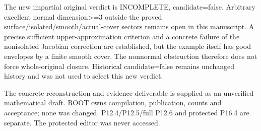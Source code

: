 \documentclass[11pt]{article}
\begin{document}
The new impartial original verdict is INCOMPLETE, candidate=false. Arbitrary excellent normal dimension>=3 outside the proved surface/isolated/smooth/actual-cover sectors remains open in this manuscript. A precise sufficient upper-approximation criterion and a concrete failure of the nonisolated Jacobian correction are established, but the example itself has good envelopes by a finite smooth cover. The nonnormal obstruction therefore does not force whole-original closure. Historical candidate=false remains unchanged history and was not used to select this new verdict.

The concrete reconstruction and evidence deliverable is supplied as an unverified mathematical draft. ROOT owns compilation, publication, counts and acceptance; none was changed. P12.4/P12.5/full P12.6 and protected P16.4 are separate. The protected editor was never accessed.
\end{document}
